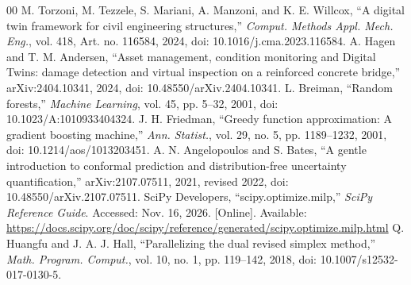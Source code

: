 \documentclass[conference]{IEEEtran}
\begin{document}
\balance
\begin{thebibliography}{00}
 M. Torzoni, M. Tezzele, S. Mariani, A. Manzoni, and K. E. Willcox, ``A digital twin framework for civil engineering structures,'' \emph{Comput. Methods Appl. Mech. Eng.}, vol. 418, Art. no. 116584, 2024, doi: 10.1016/j.cma.2023.116584.
 A. Hagen and T. M. Andersen, ``Asset management, condition monitoring and Digital Twins: damage detection and virtual inspection on a reinforced concrete bridge,'' arXiv:2404.10341, 2024, doi: 10.48550/arXiv.2404.10341.
 L. Breiman, ``Random forests,'' \emph{Machine Learning}, vol. 45, pp. 5--32, 2001, doi: 10.1023/A:1010933404324.
 J. H. Friedman, ``Greedy function approximation: A gradient boosting machine,'' \emph{Ann. Statist.}, vol. 29, no. 5, pp. 1189--1232, 2001, doi: 10.1214/aos/1013203451.
 A. N. Angelopoulos and S. Bates, ``A gentle introduction to conformal prediction and distribution-free uncertainty quantification,'' arXiv:2107.07511, 2021, revised 2022, doi: 10.48550/arXiv.2107.07511.
 SciPy Developers, ``scipy.optimize.milp,'' \emph{SciPy Reference Guide}. Accessed: Nov. 16, 2026. [Online]. Available: \url{https://docs.scipy.org/doc/scipy/reference/generated/scipy.optimize.milp.html}
 Q. Huangfu and J. A. J. Hall, ``Parallelizing the dual revised simplex method,'' \emph{Math. Program. Comput.}, vol. 10, no. 1, pp. 119--142, 2018, doi: 10.1007/s12532-017-0130-5.
\end{thebibliography}
\end{document}
